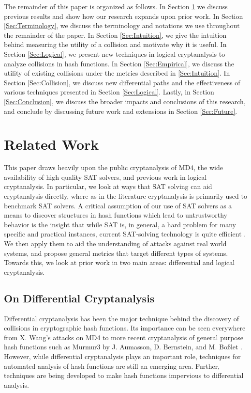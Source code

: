 \documentclass[conference]{IEEEtran}
\begin{document}
The remainder of this paper is organized as follows. In Section
\ref{Sec:Related} we discuss previous results and show how our research
expands upon prior work. In Section \ref{Sec:Terminology}, we discuss the
terminology and notations we use throughout the remainder of the paper.
In Section \ref{Sec:Intuition}, we give the intuition behind measuring
the utility of a collision and motivate why it is useful. In Section
\ref{Sec:Logical}, we present new techniques in logical cryptanalysis to
analyze collisions in hash functions. In Section \ref{Sec:Empirical}, we
discuss the utility of existing collisions under the metrics described in
\ref{Sec:Intuition}. In Section \ref{Sec:Collision}, we discuss new
differential paths and the effectiveness of various techniques presented
in Section \ref{Sec:Logical}. Lastly, in Section \ref{Sec:Conclusion}, we
discuss the broader impacts and conclusions of this research, and
conclude by discussing future work and extensions in Section \ref{Sec:Future}.

\section{Related Work} \label{Sec:Related}

This paper draws heavily upon the public cryptanalysis of MD4, the wide
availability of high quality SAT solvers, and previous work in logical
cryptanalysis. In particular, we look at ways that SAT solving can aid
cryptanalysis directly, where as in the literature cryptanalysis is
primarily used to benchmark SAT
solvers.  A critical assumption of our use of SAT solvers as a means
to discover structures in hash functions which lead to untrustworthy
behavior is the insight that while SAT is, in general, a hard problem
for many specific and practical instances, current SAT-solving
technology is quite efficient \cite{vardi2010p}. We
then apply them to aid the understanding of attacks against real world
systems, and propose general metrics that target different types of systems.
Towards this, we look at prior work in two main areas: differential and logical
cryptanalysis.

\subsection{On Differential Cryptanalysis}

Differential cryptanalysis has been the major technique behind the discovery
of collisions in cryptographic hash functions. Its importance can be seen
everywhere from X. Wang's attacks on MD4 \cite{Wang2005} to more recent
cryptanalysis of general purpose hash functions such as Murmur3 by
J. Aumasson, D. Bernstein, and M. Bo{\ss}let \cite{murmur3DC}. However, while
differential cryptanalysis plays an important role, techniques for automated
analysis of hash functions are still an emerging area. Further, techniques
are being developed to make hash functions impervious to differential
analysis.
\end{document}
